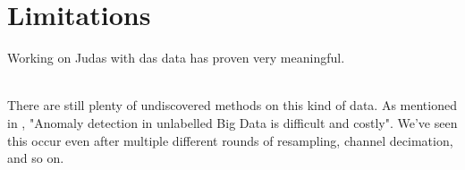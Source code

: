 \section{Limitations}

Working on Judas with \acrshort{das} data has proven very meaningful. \\\

There are still plenty of undiscovered methods on this kind of data. As mentioned in \cite{MALEKI2021107443}, "Anomaly detection in unlabelled Big Data is difficult and costly". We've seen this occur even after multiple different rounds of resampling, channel decimation, and so on. 